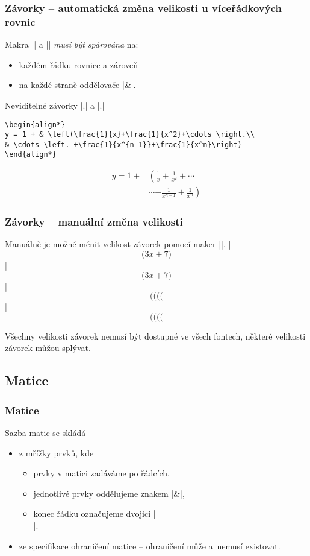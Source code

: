 \begin{frame}[fragile]
	\frametitle{Závorky -- automatická změna velikosti u víceřádkových rovnic}
	Makra |\left| a |\right| \emph{musí být spárována} na:
	\begin{itemize}
		\item každém řádku rovnice a zároveň
		\item na každé straně oddělovače |&|.
	\end{itemize}
	Neviditelné závorky |\left.| a |\right.|\par
	\begin{BVerbatim}
\begin{align*}
y = 1 + & \left(\frac{1}{x}+\frac{1}{x^2}+\cdots \right.\\
& \cdots \left. +\frac{1}{x^{n-1}}+\frac{1}{x^n}\right)
\end{align*}
	\end{BVerbatim}
	\begin{align*}
		y  = 1 + & \left(  \frac{1}{x} + \frac{1}{x^2} + \cdots \right. \\
  		& \cdots \left. + \frac{1}{x^{n-1}} + \frac{1}{x^n} \right)
	\end{align*}
\end{frame}


\begin{frame}[fragile]
	\frametitle{Závorky -- manuální změna velikosti}
	Manuálně je možné měnit velikost závorek pomocí maker |\big|.
	|$$\bigg( 3x+7 \big)$$|
	$$\bigg( 3x+7 \big)$$
	|$$\big( \Big( \bigg( \Bigg($$|
	$$\big( \Big( \bigg( \Bigg($$
	\begin{remark}
		Všechny velikosti závorek nemusí být dostupné ve všech fontech, některé velikosti závorek můžou splývat.
	\end{remark}
\end{frame}


\subsection{Matice}
\begin{frame}[fragile]
	\frametitle{Matice}
	Sazba matic se skládá
	\begin{itemize}
		\item z mřížky prvků, kde
			\begin{itemize}
				\item prvky v matici zadáváme po řádcích,
				\item jednotlivé prvky oddělujeme znakem |&|,
				\item konec řádku označujeme dvojicí |\\|.
			\end{itemize}
		\item ze specifikace ohraničení matice -- ohraničení může a~nemusí existovat.
	\end{itemize}
\end{frame}


